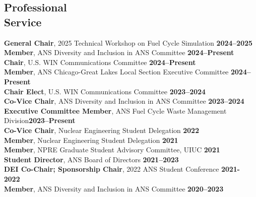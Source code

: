 \documentclass[margin,line]{resume}
\begin{document}
\begin{resume}
    \section{\mysidestyle Professional\\Service}
        \textbf{General Chair}, 2025 Technical Workshop on Fuel Cycle Simulation \hfill \textbf{2024--2025}\\
        \textbf{Member}, ANS Diversity and Inclusion in ANS Committee \hfill \textbf{2024--Present} \\
        \textbf{Chair}, U.S. WIN Communications Committee \hfill \textbf{2024--Present} \\
        \textbf{Member}, ANS Chicago-Great Lakes Local Section Executive Committee \hfill \textbf{2024--Present}\vspace{0.5mm}\\
        \textbf{Chair Elect}, U.S. WIN Communications Committee \hfill \textbf{2023--2024} \vspace{0.5mm}\\
        \textbf{Co-Vice Chair}, ANS Diversity and Inclusion in ANS Committee \hfill \textbf{2023--2024}\vspace{0.5mm}\\
        \textbf{Executive Committee Member}, ANS Fuel Cycle Waste Management Division\hfill \textbf{2023--Present}\vspace{0.5mm}\\
        \textbf{Co-Vice Chair}, Nuclear Engineering Student Delegation \hfill \textbf{2022}\vspace{0.5mm}\\
        \textbf{Member}, Nuclear Engineering Student Delegation \hfill \textbf{2021}\vspace{0.5mm}\\
        \textbf{Member}, NPRE Graduate Student Advisory Committee, UIUC \hfill \textbf{2021}\vspace{0.5mm}\\
        \textbf{Student Director}, ANS Board of Directors \hfill \textbf{2021--2023}\vspace{.5mm}\\
        \textbf{DEI Co-Chair; Sponsorship Chair}, 2022 ANS Student Conference  \hfill \textbf{2021-2022}\vspace{0.5mm}\\
        \textbf{Member}, ANS Diversity and Inclusion in ANS Committee  \hfill \textbf{2020--2023}\vspace{.5mm}\\%

\end{resume}
\end{document}
